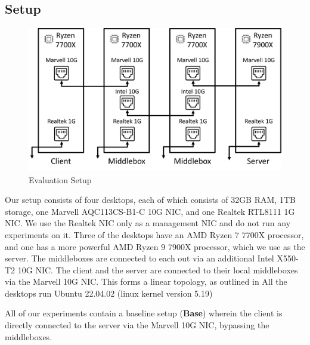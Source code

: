 \subsection{Setup}
\label{subsec:netshaper-evaluation-setup}

\begin{figure}[!htb]
    \centering
    \includegraphics[width=\columnwidth]{figures/netshaper/testbed-setup.png}
    \caption{Evaluation Setup}
    \label{fig:testbed-setup}
\end{figure}

Our setup consists of four desktops, each of which consists of 32GB RAM, 1TB storage, one Marvell AQC113CS-B1-C 10G NIC, and one Realtek RTL8111 1G NIC.
We use the Realtek NIC only as a management NIC and do not run any experiments on it.
Three of the desktops have an AMD Ryzen 7 7700X processor, and one has a more powerful AMD Ryzen 9 7900X processor, which we use as the server.
The middleboxes are connected to each out via an additional Intel X550-T2 10G NIC.
The client and the server are connected to their local middleboxes via the Marvell 10G NIC.
This forms a linear topology, as outlined in 
All the desktops run Ubuntu 22.04.02 (linux kernel version 5.19)

All of our experiments contain a baseline setup (\textbf{Base}) wherein the client is directly connected to the server via the Marvell 10G NIC, bypassing the middleboxes.

\endinput

Mention iperf, wrk2 (modified), nginx?
Maybe here maybe in the experiments themselves